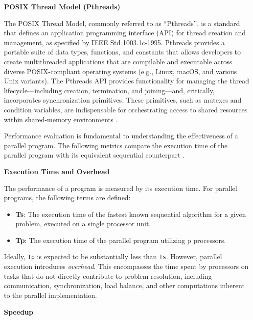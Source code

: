 \textbf{POSIX Thread Model (Pthreads)}

The POSIX Thread Model, commonly referred to as “Pthreads”, is a standard that defines an application programming interface (API) for thread creation and management, as specified by IEEE Std 1003.1c-1995. Pthreads provides a portable suite of data types, functions, and constants that allows developers to create multithreaded applications that are compilable and executable across diverse POSIX-compliant operating systems (e.g., Linux, macOS, and various Unix variants). The Pthreads API provides functionality for managing the thread lifecycle—including creation, termination, and joining—and, critically, incorporates synchronization primitives. These primitives, such as mutexes and condition variables, are indispensable for orchestrating access to shared resources within shared-memory environments \cite{Butenhof1997, Pacheco2011}.


Performance evaluation is fundamental to understanding the effectiveness of a parallel program. The following metrics compare the execution time of the parallel program with its equivalent sequential counterpart \cite{Grama2003}.

\textbf{Execution Time and Overhead}

The performance of a program is measured by its execution time. For parallel programs, the following terms are defined:
\begin{itemize}
    \item \textbf{Ts}: The execution time of the fastest known sequential algorithm for a given problem, executed on a single processor unit.
    \item \textbf{Tp}: The execution time of the parallel program utilizing p processors.
\end{itemize}

Ideally, \texttt{Tp} is expected to be substantially less than \texttt{Ts}. However, parallel execution introduces \textit{overhead}. This encompasses the time spent by processors on tasks that do not directly contribute to problem resolution, including communication, synchronization, load balance, and other computations inherent to the parallel implementation.

\textbf{Speedup}

